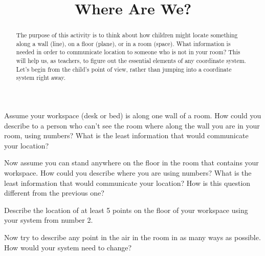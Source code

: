 \documentclass[nooutcomes,noauthor,handout] {ximera}
\title{Where Are We?}
\begin{document}
\begin{abstract}
The purpose of this activity is to think about how children might locate something along a wall (line), on a floor (plane), or in a room (space).  What information is needed in order to communicate location to someone who is not in your room?  This will help us, as teachers, to figure out the essential elements of any coordinate system.  Let's begin from the child's point of view, rather than jumping into a coordinate system right away.
\end{abstract}
\maketitle



\begin{problem}

Assume your workspace (desk or bed) is along one wall of a room.  How could you describe to a person who can't see the room where along the wall you are in your room, using numbers?  What is the least information that would communicate your location? 

\end{problem}

\begin{problem}
Now assume you can stand anywhere on the floor in the room that contains your workspace.  How could you describe where you are using numbers?  What is the least information that would communicate your location? How is this question different from the previous one?

\end{problem}



\begin{problem}
Describe the location of at least 5 points on the floor of your workspace using your system from number 2.
\end{problem}

\begin{problem}
Now try to describe any point in the air in the room in as many ways as possible. How would your system need to change?
\end{problem}
\end{document}
